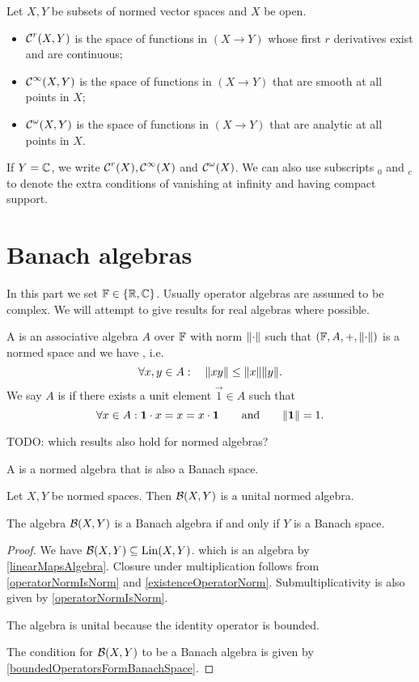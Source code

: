 \begin{definition}
Let $X,Y$ be subsets of normed vector spaces and $X$ be open.
\begin{itemize}
\item $\operatorname{\mathcal{C}}^r(X,Y)$ is the space of functions in $(X \to Y)$ whose first $r$ derivatives exist and are continuous;
\item $\operatorname{\mathcal{C}}^\infty(X,Y)$ is the space of functions in $(X \to Y)$ that are smooth at all points in $X$;
\item $\operatorname{\mathcal{C}}^\omega(X,Y)$ is the space of functions in $(X \to Y)$ that are analytic at all points in $X$.
\end{itemize}
If $Y = \mathbb{C}$, we write $\operatorname{\mathcal{C}}^r(X), \operatorname{\mathcal{C}}^\infty(X)$ and $\operatorname{\mathcal{C}}^\omega(X)$. We can also use subscripts $_0$ and $_c$ to denote the extra conditions of vanishing at infinity and having compact support.
\end{definition}







\chapter{Banach algebras}
In this part we set $\mathbb{F} \in \{\mathbb{R}, \mathbb{C}\}$. Usually operator algebras are assumed to be complex. We will attempt to give results for real algebras where possible.
\begin{definition}
A  is an associative algebra $A$ over $\mathbb{F}$ with norm $\lVert\cdot\rVert$ such that $(\mathbb{F}, A,+, \lVert\cdot\rVert)$ is a normed space and we have , i.e.
\[ \forall x,y\in A: \quad \lVert xy\rVert\leq\lVert x\rVert\lVert y\rVert. \]
We say $A$ is  if there exists a unit element $\vec{1}\in A$ such that
\[ \forall x\in A: \boldsymbol{\mathrm{1}}\cdot x = x = x\cdot \boldsymbol{\mathrm{1}} \qquad \text{and} \qquad \lVert\boldsymbol{\mathrm{1}}\rVert = 1. \]
\end{definition}
TODO: which results also hold for normed algebras?
\begin{definition}
A  is a normed algebra that is also a Banach space.
\end{definition}

\begin{proposition}
Let $X,Y$ be normed spaces. Then $\operatorname{\mathcal{B}}(X,Y)$ is a unital normed algebra.

The algebra $\operatorname{\mathcal{B}}(X,Y)$ is a Banach algebra \textup{if and only if} $Y$ is a Banach space.
\end{proposition}
\begin{proof}
We have $\operatorname{\mathcal{B}}(X,Y)\subseteq \operatorname{Lin}(X,Y)$. which is an algebra by \ref{linearMapsAlgebra}. Closure under multiplication follows from \ref{operatorNormIsNorm} and \ref{existenceOperatorNorm}. Submultiplicativity is also given by \ref{operatorNormIsNorm}.

The algebra is unital because the identity operator is bounded.

The condition for $\operatorname{\mathcal{B}}(X,Y)$ to be a Banach algebra is given by \ref{boundedOperatorsFormBanachSpace}.
\end{proof}

